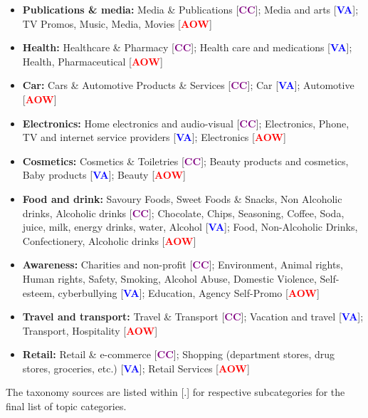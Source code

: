 \begin{itemize}
    \item \textbf{Publications \& media:} Media \& Publications  [\textcolor{purple}{\textbf{CC}}]; Media and arts [\textcolor{blue}{\textbf{VA}}]; TV Promos, Music, Media, Movies [\textcolor{red}{\textbf{AOW}}]
    \item \textbf{Health:} Healthcare \& Pharmacy [\textcolor{purple}{\textbf{CC}}]; Health care and medications [\textcolor{blue}{\textbf{VA}}]; Health, Pharmaceutical [\textcolor{red}{\textbf{AOW}}]
    \item \textbf{Car:} Cars \& Automotive Products \& Services [\textcolor{purple}{\textbf{CC}}]; Car [\textcolor{blue}{\textbf{VA}}]; Automotive [\textcolor{red}{\textbf{AOW}}]
    \item \textbf{Electronics:} Home electronics and audio-visual [\textcolor{purple}{\textbf{CC}}]; Electronics, Phone, TV and internet service providers [\textcolor{blue}{\textbf{VA}}]; Electronics [\textcolor{red}{\textbf{AOW}}]
    \item \textbf{Cosmetics:} Cosmetics \& Toiletries [\textcolor{purple}{\textbf{CC}}]; Beauty products and cosmetics, Baby products [\textcolor{blue}{\textbf{VA}}]; Beauty [\textcolor{red}{\textbf{AOW}}]
    \item \textbf{Food and drink:} Savoury Foods, Sweet Foods \& Snacks, Non Alcoholic drinks, Alcoholic drinks [\textcolor{purple}{\textbf{CC}}]; Chocolate, Chips, Seasoning, Coffee, Soda, juice, milk, energy drinks, water, Alcohol [\textcolor{blue}{\textbf{VA}}]; Food, Non-Alcoholic Drinks, Confectionery, Alcoholic drinks [\textcolor{red}{\textbf{AOW}}]
    \item \textbf{Awareness:} Charities and non-profit [\textcolor{purple}{\textbf{CC}}]; Environment, Animal rights, Human rights, Safety, Smoking, Alcohol Abuse, Domestic Violence, Self-esteem, cyberbullying [\textcolor{blue}{\textbf{VA}}]; Education, Agency Self-Promo [\textcolor{red}{\textbf{AOW}}]
    \item \textbf{Travel and transport:} Travel \& Transport [\textcolor{purple}{\textbf{CC}}]; Vacation and travel [\textcolor{blue}{\textbf{VA}}]; Transport, Hospitality [\textcolor{red}{\textbf{AOW}}]
    \item \textbf{Retail:} Retail \& e-commerce [\textcolor{purple}{\textbf{CC}}]; Shopping (department stores, drug stores, groceries, etc.) [\textcolor{blue}{\textbf{VA}}]; Retail Services [\textcolor{red}{\textbf{AOW}}]
\end{itemize}
The taxonomy sources are listed within [.] for respective subcategories for the final list of topic categories. 
